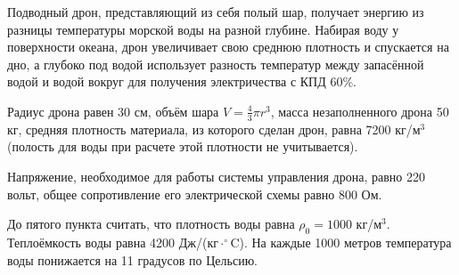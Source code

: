 
Подводный дрон, представляющий из себя полый шар, получает энергию из разницы температуры морской воды на разной 
глубине. Набирая воду у поверхности океана, дрон увеличивает свою среднюю плотность и спускается на дно, а 
глубоко под водой использует разность температур между запасённой водой и водой вокруг для получения 
электричества с КПД 60\%. 

Радиус дрона равен 30 см, объём шара $V=\frac{4}{3} \pi r^3$, масса незаполненного дрона 50 кг, средняя 
плотность материала, из которого сделан дрон, равна 7200 кг/м$^3$ (полость для воды при расчете этой 
плотности не учитывается).

Напряжение, необходимое для работы системы управления дрона, равно 220 вольт, общее сопротивление его 
электрической схемы равно 800 Ом.

До пятого пункта считать, что плотность воды равна $\rho_0=1000$ кг/м$^3$. Теплоёмкость воды равна 
4200 Дж/(кг$\cdot ^{\circ}$C). На каждые 1000 метров температура воды понижается на 11 градусов по Цельсию.

